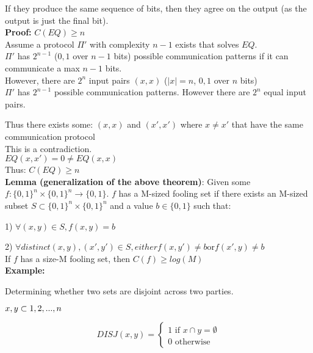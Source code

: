 \documentclass[12pt]{article}
\begin{document}
If they produce the same sequence of bits, then they agree on the output (as the output is just the final bit).
\\

\textbf{Proof:} $C(EQ) \geq n$
\\

Assume a protocol $\Pi'$ with complexity $n - 1$ exists that solves $EQ$.
\\

$\Pi'$ has $2^{n - 1}$ (${0, 1}$ over $n - 1$ bits) possible communication patterns if it can communicate a max $n - 1$
bits.
\\

However, there are $2^{n}$ input pairs $(x, x)$ ($|x| = n$, ${0, 1}$ over $n$ bits)
\\

$\Pi'$ has $2^{n - 1}$ possible communication patterns.
However there are $2^{n}$ equal input pairs.

Thus there exists some:
$(x, x)$ and $(x', x')$ where $x \neq x'$ that have the same communication protocol
\\

This is a contradiction.
\\
$EQ(x, x') = 0 \neq EQ(x, x)$
\\

Thus: $C(EQ) \geq n$
\\

\textbf{Lemma (generalization of the above theorem)}: Given some $f : \{0, 1\}^{n} \times \{0, 1\}^{n} \rightarrow \{0, 1\}$. $f$
has a M-sized fooling set if there exists an M-sized subset $S \subset \{0, 1\}^{n} \times \{0, 1\}^{n}$ and a value
$b \in \{0, 1\}$ such that:
\par{1) $\forall (x, y) \in S, f(x, y) = b$}
\par{2) $\forall distinct (x, y), (x', y') \in S, either f(x, y') \neq b \text{or} f(x', y) \neq b$}
\\
If $f$ has a size-M fooling set, then $C(f) \geq log(M)$
\\

\textbf{Example:}
\par{Determining whether two sets are disjoint across two parties.}

\par{$x, y \subset {1, 2, ..., n} \\$}
\\
\par{
  \begin{equation}
    DISJ(x, y) =
    \begin{cases}
      1 \text{ if } x \cap y = \emptyset \\
      0 \text{ otherwise}
    \end{cases}
  \end{equation}
}
\end{document}
